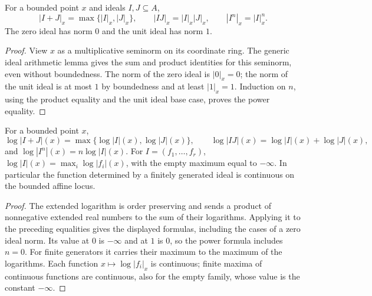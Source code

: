 \begin{lemma}
\label{lem:ideal-norm-arithmetic}
\leanok
{}
For a bounded point $x$ and ideals $I,J\subseteq A$,
\[
 |I+J|_x=\max\{|I|_x,|J|_x\},\qquad
 |IJ|_x=|I|_x|J|_x,\qquad |I^n|_x=|I|_x^n.
\]
The zero ideal has norm $0$ and the unit ideal has norm $1$.
\end{lemma}
\begin{proof}
View $x$ as a multiplicative seminorm on its coordinate ring. The generic
ideal arithmetic lemma gives the sum and product identities for this
seminorm, even without boundedness.
The norm of the zero ideal is $|0|_x=0$; the norm of the unit ideal is
at most $1$ by boundedness and at least $|1|_x=1$. Induction on $n$,
using the product equality and the unit ideal base case, proves the
power equality.
\end{proof}

\begin{lemma}
\label{lem:ideal-log-arithmetic}
\leanok
{}
For a bounded point $x$,
\[
 \log|I+J|(x)=\max\{\log|I|(x),\log|J|(x)\},\qquad
 \log|IJ|(x)=\log|I|(x)+\log|J|(x),
\]
and $\log|I^n|(x)=n\log|I|(x)$.
For $I=(f_1,\ldots,f_r)$,
$\log|I|(x)=\max_i\log|f_i|(x)$, with the empty maximum equal
to $-\infty$. In particular the function determined by a finitely
generated ideal is continuous on the bounded affine locus.
\end{lemma}
\begin{proof}
The extended logarithm is order preserving and sends a product of
nonnegative extended real numbers to the sum of their logarithms.
Applying it to the preceding equalities gives the displayed formulas,
including the cases of a zero ideal norm. Its value at $0$ is
$-\infty$ and at $1$ is $0$, so the power formula includes $n=0$.
For finite generators it carries their maximum to the maximum of the
logarithms. Each function $x\mapsto\log|f_i|_x$ is continuous;
finite maxima of continuous functions are continuous, also for the
empty family, whose value is the constant $-\infty$.
\end{proof}

